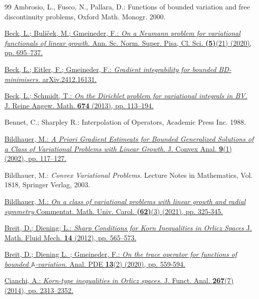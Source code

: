 \documentclass[a4paper,10pt,reqno,oneside]{amsart}
\numberwithin{equation}{section}
\newcommand{\Aop}{\mathbb{A}}
\begin{document}
\begin{thebibliography}{99}
 Ambrosio, L., Fusco, N., Pallara, D.: Functions of bounded variation and free discontinuity problems, Oxford Math. Monogr. 2000.

\href{https://doi.org/10.2422/2036-2145.201802_005}{Beck, L.; Bul\'{i}\v{c}ek, M.; Gmeineder, F.: \textit{On a Neumann problem for variational functionals of linear growth.} Ann. Sc. Norm. Super. Pisa, Cl. Sci. \textbf{(5)}(21) (2020), pp. 695--737.}

 \href{https://doi.org/10.48550/arXiv.2412.16131}{Beck, L.; Eitler, F.; Gmeineder, F.: \textit{Gradient integrability for bounded BD-minimisers.} arXiv.2412.16131.}

\href{https://doi.org/10.1515/CRELLE.2011.188}{Beck, L.; Schmidt, T.: \textit{On the Dirichlet problem for variational integrals in BV.} J. Reine Angew. Math. \textbf{674} (2013), pp. 113--194.}

 Bennet, C.; Sharpley R.: Interpolation of Operators, Academic Press Inc. 1988.

\href{https://www.heldermann-verlag.de/jca/jca09/jca0333.pdf}{Bildhauer, M.: \textit{A Priori Gradient Estimeats for Bounded Generalized Solutions of a Class of Variational Problems with Linear Growth.} J. Convex Anal. \textbf{9}(1) (2002), pp. 117--127. }

 Bildhauer, M.: \textit{Convex Variational Problems.} Lecture Notes in Mathematics, Vol. 1818, Springer Verlag, 2003.
 
 \href{https://dml.cz/handle/10338.dmlcz/149149}{Bildhauer, M.: \textit{On a class of variational problems with linear growth and radial symmetry} Commentat. Math. Univ. Carol. \textbf{(62)}(3) (2021), pp. 325-345.}
 
 
\href{ https://doi.org/10.1007/s00021-011-0082-x}{Breit, D.; Diening; L.: \textit{Sharp Conditions for Korn Inequalities in Orlicz Spaces} J. Math. Fluid Mech. \textbf{14} (2012), pp. 565--573.}

\href{https://doi.org/10.2140/apde.2020.13.559}{Breit, D.; Diening L. ; Gmeineder, F.: \textit{On the trace operator for functions of bounded $\Aop$-variation.} Anal. PDE \textbf{13}(2) (2020), pp. 559-594.}

 \href{https://doi.org/10.1016/j.jfa.2014.07.012}{Cianchi, A.: \textit{Korn-type inequalities in Orlicz spaces.} J. Funct. Anal. \textbf{ 267}(7) (2014), pp. 2313--2352.}


\end{thebibliography}
\end{document}
